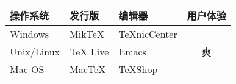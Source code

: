 \centering
\begin{tabular}{lllc}
    \toprule
    操作系统 & 发行版 & 编辑器 & 用户体验\\
    \midrule
    Windows & MikTeX & TeXnicCenter & 
    \multirow{3}{*}{\centering 爽} \\
    Unix/Linux & TeX Live & Emacs \\
    Mac OS & MacTeX & TeXShop \\
    \bottomrule
\end{tabular}
